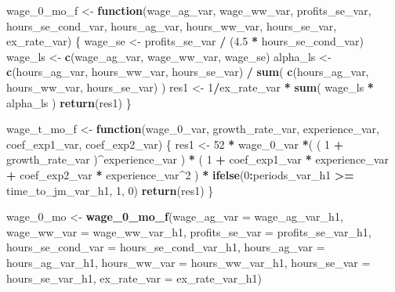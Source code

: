 \documentclass[]{article}
\newenvironment{Shaded}{\begin{snugshade}}{\end{snugshade}}
\newcommand{\ControlFlowTok}[1]{\textcolor[rgb]{0.13,0.29,0.53}{\textbf{#1}}}
\newcommand{\DataTypeTok}[1]{\textcolor[rgb]{0.13,0.29,0.53}{#1}}
\newcommand{\DecValTok}[1]{\textcolor[rgb]{0.00,0.00,0.81}{#1}}
\newcommand{\FloatTok}[1]{\textcolor[rgb]{0.00,0.00,0.81}{#1}}
\newcommand{\KeywordTok}[1]{\textcolor[rgb]{0.13,0.29,0.53}{\textbf{#1}}}
\newcommand{\NormalTok}[1]{#1}
\newcommand{\OperatorTok}[1]{\textcolor[rgb]{0.81,0.36,0.00}{\textbf{#1}}}
\newcommand{\StringTok}[1]{\textcolor[rgb]{0.31,0.60,0.02}{#1}}
\begin{document}
\begin{Shaded}
\begin{Highlighting}[]
\NormalTok{    wage_}\DecValTok{0}\NormalTok{_mo_f <-}\StringTok{ }\ControlFlowTok{function}\NormalTok{(wage_ag_var, wage_ww_var, profits_se_var, hours_se_cond_var, }
\NormalTok{                            hours_ag_var, hours_ww_var, hours_se_var, ex_rate_var) \{}
\NormalTok{      wage_se <-}\StringTok{ }\NormalTok{profits_se_var }\OperatorTok{/}\StringTok{ }\NormalTok{(}\FloatTok{4.5} \OperatorTok{*}\StringTok{ }\NormalTok{hours_se_cond_var)}
\NormalTok{      wage_ls <-}\StringTok{ }\KeywordTok{c}\NormalTok{(wage_ag_var, wage_ww_var, wage_se)}
\NormalTok{      alpha_ls <-}\StringTok{ }\KeywordTok{c}\NormalTok{(hours_ag_var, hours_ww_var, hours_se_var) }\OperatorTok{/}\StringTok{ }\KeywordTok{sum}\NormalTok{( }\KeywordTok{c}\NormalTok{(hours_ag_var, hours_ww_var, hours_se_var) )}
\NormalTok{      res1 <-}\StringTok{ }\DecValTok{1}\OperatorTok{/}\NormalTok{ex_rate_var }\OperatorTok{*}\StringTok{ }\KeywordTok{sum}\NormalTok{( wage_ls }\OperatorTok{*}\StringTok{ }\NormalTok{alpha_ls )}
      \KeywordTok{return}\NormalTok{(res1)}
\NormalTok{    \}}
    
\NormalTok{    wage_t_mo_f <-}\StringTok{ }\ControlFlowTok{function}\NormalTok{(wage_}\DecValTok{0}\NormalTok{_var,}
\NormalTok{                       growth_rate_var,}
\NormalTok{                       experience_var,}
\NormalTok{                       coef_exp1_var,}
\NormalTok{                       coef_exp2_var) \{}
\NormalTok{      res1 <-}\StringTok{ }\DecValTok{52} \OperatorTok{*}\StringTok{ }\NormalTok{wage_}\DecValTok{0}\NormalTok{_var }\OperatorTok{*}\NormalTok{( ( }\DecValTok{1} \OperatorTok{+}\StringTok{ }\NormalTok{growth_rate_var )}\OperatorTok{^}\NormalTok{experience_var ) }\OperatorTok{*}
\StringTok{        }\NormalTok{( }\DecValTok{1} \OperatorTok{+}\StringTok{ }\NormalTok{coef_exp1_var }\OperatorTok{*}\StringTok{ }\NormalTok{experience_var }\OperatorTok{+}\StringTok{ }\NormalTok{coef_exp2_var }\OperatorTok{*}\StringTok{ }\NormalTok{experience_var}\OperatorTok{^}\DecValTok{2}\NormalTok{ ) }\OperatorTok{*}
\StringTok{        }\KeywordTok{ifelse}\NormalTok{(}\DecValTok{0}\OperatorTok{:}\NormalTok{periods_var_h1 }\OperatorTok{>=}\StringTok{ }\NormalTok{time_to_jm_var_h1, }\DecValTok{1}\NormalTok{, }\DecValTok{0}\NormalTok{)}
      \KeywordTok{return}\NormalTok{(res1)}
\NormalTok{    \}}
    
\NormalTok{    wage_}\DecValTok{0}\NormalTok{_mo <-}\StringTok{ }\KeywordTok{wage_0_mo_f}\NormalTok{(}\DataTypeTok{wage_ag_var =}\NormalTok{ wage_ag_var_h1,  }
                         \DataTypeTok{wage_ww_var =}\NormalTok{ wage_ww_var_h1,}
                         \DataTypeTok{profits_se_var =}\NormalTok{ profits_se_var_h1,}
                         \DataTypeTok{hours_se_cond_var =}\NormalTok{ hours_se_cond_var_h1,  }
                         \DataTypeTok{hours_ag_var =}\NormalTok{ hours_ag_var_h1,}
                         \DataTypeTok{hours_ww_var =}\NormalTok{ hours_ww_var_h1,}
                         \DataTypeTok{hours_se_var =}\NormalTok{ hours_se_var_h1,}
                         \DataTypeTok{ex_rate_var =}\NormalTok{ ex_rate_var_h1)  }


\end{Highlighting}
\end{Shaded}
\end{document}
